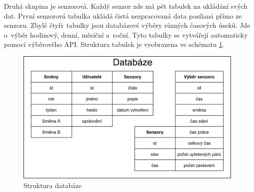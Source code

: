Druhá skupina je senzorová.
Každý senzor zde má pět tabulek na ukládání svých dat.
První senzorová tabulka ukládá čistá nezpracovaná data posílaná přímo ze senzoru.
Zbylé čtyři~tabulky jsou databázové výběry různých časových úseků.
Jde o~výběr hodinový, denní, měsíční a~roční.  
Tyto tabulky se vytvářejí automaticky pomocí výběrového API. 
Struktura tabulek je vyobrazena ve schématu \ref{fig:databaze}.


\begin{figure}[htbp]
    \centering
    \includegraphics[width=\textwidth]{img/Databaze.png}
    \caption{Struktura databáze}
    \label{fig:databaze}
\end{figure}


\newpage